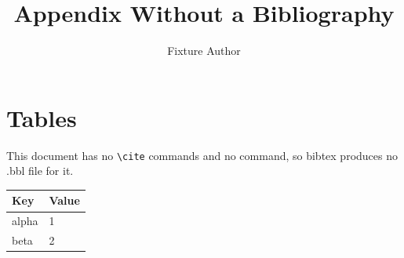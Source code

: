 \documentclass[11pt]{article}
\title{Appendix Without a Bibliography}
\author{Fixture Author}
\date{}
\begin{document}
\maketitle

\section{Tables}
This document has no \verb|\cite| commands and no \verb|| command,
so bibtex produces no .bbl file for it.

\begin{tabular}{ll}
  Key & Value \\
  \hline
  alpha & 1 \\
  beta & 2 \\
\end{tabular}
\end{document}
